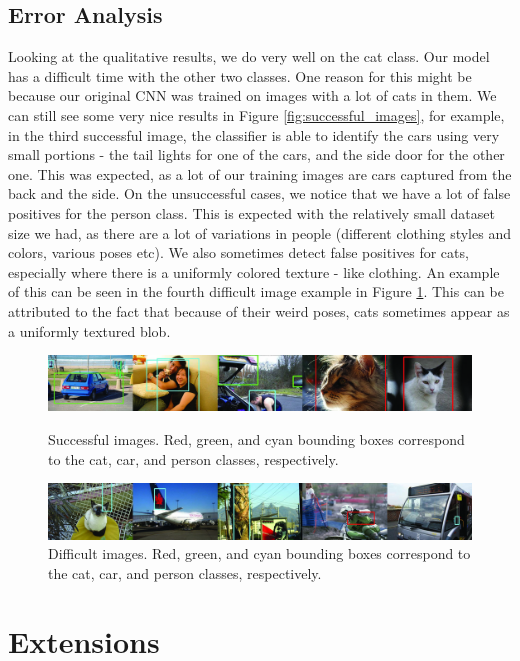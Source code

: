 \documentclass[10pt,twocolumn,letterpaper]{article}
\begin{document}
\subsection{Error Analysis}
Looking at the qualitative results, we do very well on the cat class. Our model has a difficult time with the other two classes. One reason for this might be because our original CNN was trained on images with a lot of cats in them. We can still see some very nice results in Figure \ref{fig:successful_images}, for example, in the third successful image, the classifier is able to identify the cars using very small portions - the tail lights for one of the cars, and the side door for the other one. This was expected, as a lot of our training images are cars captured from the back and the side.
On the unsuccessful cases, we notice that we have a lot of false positives for the person class. This is expected with the relatively small dataset size we had, as there are a lot of variations in people (different clothing styles and colors, various poses etc). We also sometimes detect false positives for cats, especially where there is a uniformly colored texture - like clothing. An example of this can be seen in the fourth difficult image example in Figure \ref{fig:unsuccessful_images}. This can be attributed to the fact that because of their weird poses, cats sometimes appear as a uniformly textured blob.
\begin{figure}[t]
	\vspace{-5mm}
	\includegraphics[width=\textwidth]{figures/qualitative/all_good.jpg}
	\caption{Successful images. Red, green, and cyan bounding boxes correspond to the cat, car, and person classes, respectively.}
	\label{fig:successful_images}
	\vspace{4mm}
	\includegraphics[width=\textwidth]{figures/qualitative/all_bad.jpg}
	\caption{Difficult images. Red, green, and cyan bounding boxes correspond to the cat, car, and person classes, respectively.}
	\label{fig:unsuccessful_images}
\end{figure}

\section{Extensions}
\end{document}
